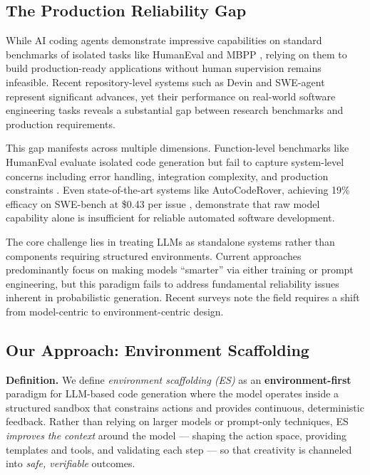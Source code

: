 \documentclass[conference]{IEEEtran}
\begin{document}
\subsection{The Production Reliability Gap}

While AI coding agents demonstrate impressive capabilities on standard benchmarks of isolated tasks like HumanEval \cite{chen2021evaluating} and MBPP \cite{austin2021program}, relying on them to build production-ready applications without human supervision remains infeasible. Recent repository-level systems such as Devin \cite{cognition2024swe} and SWE-agent \cite{yang2024swe} represent significant advances, yet their performance on real-world software engineering tasks reveals a substantial gap between research benchmarks and production requirements.

This gap manifests across multiple dimensions. Function-level benchmarks like HumanEval evaluate isolated code generation but fail to capture system-level concerns including error handling, integration complexity, and production constraints \cite{liu2023your}. Even state-of-the-art systems like AutoCodeRover, achieving 19\% efficacy on SWE-bench at \$0.43 per issue \cite{zhang2024autocoder}, demonstrate that raw model capability alone is insufficient for reliable automated software development.

The core challenge lies in treating LLMs as standalone systems rather than components requiring structured environments. Current approaches predominantly focus on making models ``smarter'' via either training or prompt engineering, but this paradigm fails to address fundamental reliability issues inherent in probabilistic generation. Recent surveys \cite{jiang2024survey,paul2024benchmarks} note the field requires a shift from model-centric to environment-centric design.

\subsection{Our Approach: Environment Scaffolding}

\textbf{Definition.} We define \emph{environment scaffolding (ES)} as an \textbf{environment-first} paradigm for LLM-based code generation where the model operates inside a structured sandbox that constrains actions and provides continuous, deterministic feedback. Rather than relying on larger models or prompt-only techniques, ES \emph{improves the context} around the model --- shaping the action space, providing templates and tools, and validating each step --- so that creativity is channeled into \emph{safe, verifiable} outcomes.
\end{document}
